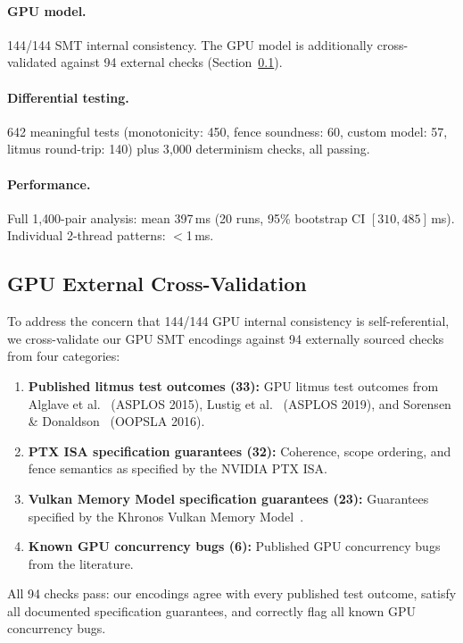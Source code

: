 \documentclass[11pt]{article}
\begin{document}
\paragraph{GPU model.}
144/144 SMT internal consistency. The GPU model is additionally
cross-validated against 94 external checks
(Section~\ref{sec:gpu-external}).

\paragraph{Differential testing.}
642 meaningful tests (monotonicity: 450, fence soundness: 60,
custom model: 57, litmus round-trip: 140) plus 3{,}000 determinism
checks, all passing.

\paragraph{Performance.}
Full 1{,}400-pair analysis: mean 397\,ms (20 runs, 95\% bootstrap CI
$[310, 485]$\,ms). Individual 2-thread patterns: $<$1\,ms.

\subsection{GPU External Cross-Validation}
\label{sec:gpu-external}

To address the concern that 144/144 GPU internal consistency is
self-referential, we cross-validate our GPU SMT encodings against
94 externally sourced checks from four categories:

\begin{enumerate}[nosep]
\item \textbf{Published litmus test outcomes (33):}
  GPU litmus test outcomes from Alglave et al.~\cite{Alglave2015GPU}
  (ASPLOS 2015), Lustig et al.~\cite{Lustig2019} (ASPLOS 2019), and
  Sorensen \& Donaldson~\cite{Sorensen2016} (OOPSLA 2016).
\item \textbf{PTX ISA specification guarantees (32):}
  Coherence, scope ordering, and fence semantics as specified
  by the NVIDIA PTX ISA.
\item \textbf{Vulkan Memory Model specification guarantees (23):}
  Guarantees specified by the Khronos Vulkan Memory
  Model~\cite{KhronosVulkan}.
\item \textbf{Known GPU concurrency bugs (6):}
  Published GPU concurrency bugs from the literature.
\end{enumerate}

\noindent
All 94 checks pass: our encodings agree with every published test
outcome, satisfy all documented specification guarantees, and correctly
flag all known GPU concurrency bugs.
\end{document}
